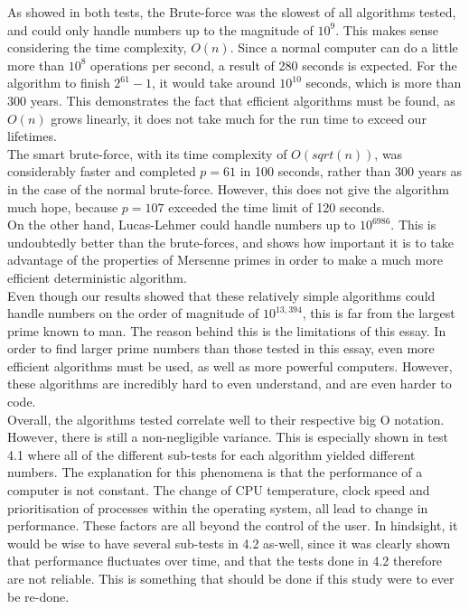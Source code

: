 \documentclass[main.tex]{subfiles}
\begin{document}

As showed in both tests, the Brute-force was the slowest of all algorithms tested, and
could only handle numbers up to the magnitude of $10^{9}$. This makes sense
considering the time complexity, $O(n)$. Since a normal computer can do a little
more than $10^{8}$ operations per second, a result of 280 seconds is expected.
For the algorithm to finish $2^{61}-1$, it would take around $10^{10}$ seconds,
which is more than 300 years. This demonstrates the fact that efficient
algorithms must be found, as $O(n)$ grows linearly, it does not take much for
the run time to exceed our lifetimes. \\

The smart brute-force, with its time complexity of $O(sqrt(n))$, was
considerably faster and completed $p=61$ in 100 seconds, rather than 300 years
as in the case of the normal brute-force. However, this does not give the
algorithm much hope, because $p=107$ exceeded the time limit of 120 seconds. \\

On the other hand, Lucas-Lehmer could handle numbers up to $10^{6986}$. This is
undoubtedly better than the brute-forces, and shows how important it is to take
advantage of the properties of Mersenne primes in order to make a much more
efficient deterministic algorithm. \\
﻿
Even though our results showed that these relatively simple algorithms could
handle numbers on the order of magnitude of $10^{13,394}$, this is far from the
largest prime known to man. The reason behind this is the limitations of this
essay. In order to find larger prime numbers than those tested in this essay,
even more efficient algorithms must be used, as well as more powerful computers.
However, these algorithms are incredibly hard to even understand, and are even
harder to code. \\

Overall, the algorithms tested correlate well to their respective big O
notation. However, there is still a non-negligible variance. This is especially
shown in test 4.1 where all of the different sub-tests for each algorithm
yielded different numbers. The explanation for this phenomena is that the
performance of a computer is not constant. The change of CPU temperature, clock
speed and prioritisation of processes within the operating system, all lead to
change in performance. These factors are all beyond the control of the user. In
hindsight, it would be wise to have several sub-tests in 4.2 as-well, since it
was clearly shown that performance fluctuates over time, and that the tests done
in 4.2 therefore are not reliable. This is something that should be done if this
study were to ever be re-done. \\
\end{document}
